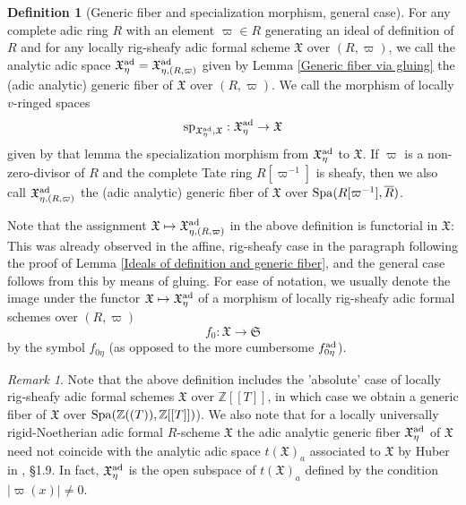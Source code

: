 \documentclass[12pt,twoside,a4paper]{article}
\theoremstyle{definition}
\newtheorem{mydef}[thm]{Definition}
\theoremstyle{remark}
\newtheorem{rmk}[thm]{Remark}
\newcommand\ad{{\rm ad}}
\newcommand\spc{{\rm sp}}
\newcommand\Spa{{\rm Spa}}
\begin{document}
\begin{mydef}[Generic fiber and specialization morphism, general case]\label{Generic fiber, general case}For any complete adic ring $R$ with an element $\varpi\in R$ generating an ideal of definition of $R$ and for any locally rig-sheafy adic formal scheme $\mathfrak{X}$ over $(R, \varpi)$, we call the analytic adic space $\mathfrak{X}_{\eta}^{\ad}=\mathfrak{X}_{\eta, (R, \varpi)}^{\ad}$ given by Lemma \ref{Generic fiber via gluing} the (adic analytic) generic fiber of $\mathfrak{X}$ over $(R, \varpi)$. We call the morphism of locally $v$-ringed spaces \begin{equation*}\spc_{\mathfrak{X}_{\eta}^{\ad},\mathfrak{X}}: \mathfrak{X}_{\eta}^{\ad}\to\mathfrak{X}\end{equation*}given by that lemma the specialization morphism from $\mathfrak{X}_{\eta}^{\ad}$ to $\mathfrak{X}$. If $\varpi$ is a non-zero-divisor of $R$ and the complete Tate ring $R[\varpi^{-1}]$ is sheafy, then we also call $\mathfrak{X}_{\eta, (R, \varpi)}^{\ad}$ the (adic analytic) generic fiber of $\mathfrak{X}$ over $\Spa(R[\varpi^{-1}], \overline{R})$.\end{mydef}
Note that the assignment $\mathfrak{X}\mapsto\mathfrak{X}_{\eta, (R, \varpi)}^{\ad}$ in the above definition is functorial in $\mathfrak{X}$: This was already observed in the affine, rig-sheafy case in the paragraph following the proof of Lemma \ref{Ideals of definition and generic fiber}, and the general case follows from this by means of gluing. For ease of notation, we usually denote the image under the functor $\mathfrak{X}\mapsto \mathfrak{X}_{\eta}^{\ad}$ of a morphism of locally rig-sheafy adic formal schemes over $(R, \varpi)$ \begin{equation*}f_{0}: \mathfrak{X}\to\mathfrak{S}\end{equation*}by the symbol $f_{0\eta}$ (as opposed to the more cumbersome $f_{0\eta}^{\ad}$).  
\begin{rmk}\label{Generic fiber and Huber's analytic adic space}Note that the above definition includes the 'absolute' case of locally rig-sheafy adic formal schemes $\mathfrak{X}$ over $\mathbb{Z}[[T]]$, in which case we obtain a generic fiber of $\mathfrak{X}$ over $\Spa(\mathbb{Z}((T)), \mathbb{Z}[[T]])$). We also note that for a locally universally rigid-Noetherian adic formal $R$-scheme $\mathfrak{X}$ the adic analytic generic fiber $\mathfrak{X}_{\eta}^{\ad}$ of $\mathfrak{X}$ need not coincide with the analytic adic space $t(\mathfrak{X})_{a}$ associated to $\mathfrak{X}$ by Huber in \cite{Huber3}, \S1.9. In fact, $\mathfrak{X}_{\eta}^{\ad}$ is the open subspace of $t(\mathfrak{X})_{a}$ defined by the condition $\vert\varpi(x)\vert\neq 0$.\end{rmk}   
\end{document}
